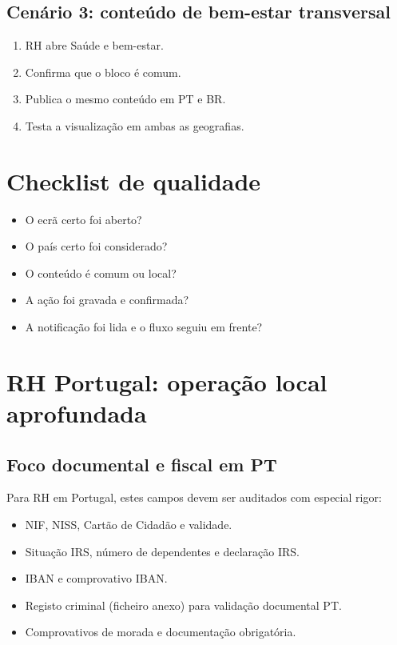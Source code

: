 \section{Cenário 3: conteúdo de bem-estar transversal}
\begin{enumerate}
  \item RH abre Saúde e bem-estar.
  \item Confirma que o bloco é comum.
  \item Publica o mesmo conteúdo em PT e BR.
  \item Testa a visualização em ambas as geografias.
\end{enumerate}

\chapter{Checklist de qualidade}
\begin{itemize}
  \item O ecrã certo foi aberto?
  \item O país certo foi considerado?
  \item O conteúdo é comum ou local?
  \item A ação foi gravada e confirmada?
  \item A notificação foi lida e o fluxo seguiu em frente?
\end{itemize}

\chapter{RH Portugal: operação local aprofundada}
\section{Foco documental e fiscal em PT}
Para RH em Portugal, estes campos devem ser auditados com especial rigor:
\begin{itemize}
  \item NIF, NISS, Cartão de Cidadão e validade.
  \item Situação IRS, número de dependentes e declaração IRS.
  \item IBAN e comprovativo IBAN.
  \item Registo criminal (ficheiro anexo) para validação documental PT.
  \item Comprovativos de morada e documentação obrigatória.
\end{itemize}

